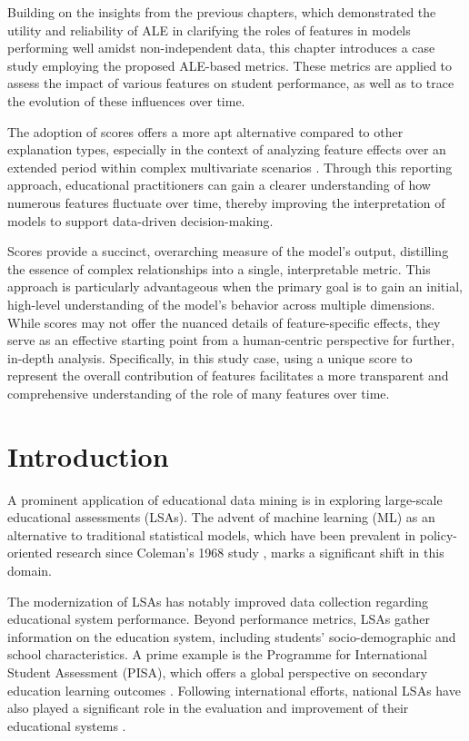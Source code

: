 Building on the insights from the previous chapters, which demonstrated the utility and reliability of ALE in clarifying the roles of features in models performing well amidst non-independent data, this chapter introduces a case study employing the proposed ALE-based metrics. These metrics are applied to assess the impact of various features on student performance, as well as to trace the evolution of these influences over time. 

The adoption of scores offers a more apt alternative compared to other explanation types, especially in the context of analyzing feature effects over an extended period within complex multivariate scenarios \cite{SilvaFilho2023AAchievement}. Through this reporting approach, educational practitioners can gain a clearer understanding of how numerous features fluctuate over time, thereby improving the interpretation of models to support data-driven decision-making.

Scores provide a succinct, overarching measure of the model's output, distilling the essence of complex relationships into a single, interpretable metric. This approach is particularly advantageous when the primary goal is to gain an initial, high-level understanding of the model's behavior across multiple dimensions. While scores may not offer the nuanced details of feature-specific effects, they serve as an effective starting point from a human-centric perspective for further, in-depth analysis. Specifically, in this study case, using a unique score to represent the overall contribution of features facilitates a more transparent and comprehensive understanding of the role of many features over time.

\section{Introduction}

A prominent application of educational data mining is in exploring large-scale educational assessments (LSAs). The advent of machine learning (ML) as an alternative to traditional statistical models, which have been prevalent in policy-oriented research since Coleman's 1968 study \cite{coleman1968equality}, marks a significant shift in this domain.

The modernization of LSAs has notably improved data collection regarding educational system performance\cite{Hernandez-Torrano2021ModernLiteratureb}. Beyond performance metrics, LSAs gather information on the education system, including students' socio-demographic and school characteristics. A prime example is the Programme for International Student Assessment (PISA), which offers a global perspective on secondary education learning outcomes \cite{VarkeyFoundation2018GlobalSTATISTICS}. Following international efforts, national LSAs have also played a significant role in the evaluation and improvement of their educational systems \cite{Johansson2016InternationalConsequences}.

